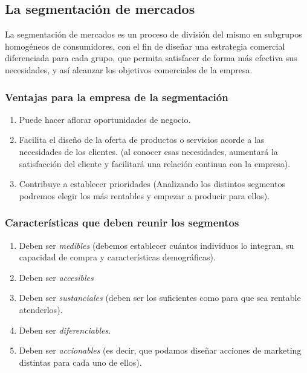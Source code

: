 \documentclass[10pt,a4paper,spanish]{report}
\begin{document}
		\subsection{\textcolor[rgb]{0.1,0.2,0.4}La segmentación de mercados}

			La segmentación de mercados es un proceso de división del mismo en subgrupos homogéneos de consumidores, con el fin de diseñar una estrategia comercial diferenciada para cada grupo, que permita satisfacer de forma más efectiva sus necesidades, y así alcanzar los objetivos comerciales de la empresa.

			\subsubsection{\textcolor[rgb]{0.1,0.2,0.4}Ventajas para la empresa de la segmentación}
				\begin{enumerate}
					\item Puede hacer aflorar oportunidades de negocio.
					\item Facilita el diseño de la oferta de productos o servicios acorde a las necesidades de los clientes. (al conocer esas necesidades, aumentará la satisfacción del cliente y facilitará una relación continua con la empresa).
					\item Contribuye a establecer prioridades (Analizando los distintos segmentos podremos elegir los más rentables y empezar a producir para ellos).
				\end{enumerate}

			\subsubsection{\textcolor[rgb]{0.1,0.2,0.4}Características que deben reunir los segmentos}
				\begin{enumerate}
					\item Deben ser \textit{\textcolor[rgb]{0.1,0.2,0.4}{medibles}} (debemos establecer cuántos individuos lo integran, su capacidad de compra y características demográficas).
					\item Deben ser \textit{\textcolor[rgb]{0.1,0.2,0.4}{accesibles}}
					\item Deben ser \textit{\textcolor[rgb]{0.1,0.2,0.4}{sustanciales}} (deben ser los suficientes como para que sea rentable atenderlos).
					\item Deben ser \textit{\textcolor[rgb]{0.1,0.2,0.4}{diferenciables}}.
					\item Deben ser \textit{\textcolor[rgb]{0.1,0.2,0.4}{accionables}} (es decir, que podamos diseñar acciones de marketing distintas para cada uno de ellos).
				\end{enumerate}
\end{document}
